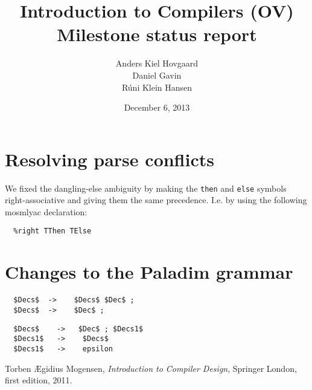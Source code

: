 \documentclass[12pt,a4paper]{article}
\begin{document}
\title{Introduction to Compilers (OV)\\
       Milestone status report}
\author{Anders Kiel Hovgaard\\
        Daniel Gavin\\
        Rúni Klein Hansen}
\date{December 6, 2013}
\maketitle

\section{Resolving parse conflicts}
We fixed the dangling-else ambiguity by making the \texttt{then} and
\texttt{else} symbols right-associative and giving them the same precedence.
I.e. by using the following mosmlyac declaration:
\begin{verbatim}
  %right TThen TElse 
\end{verbatim}

\section{Changes to the Paladim grammar}
\begin{lstlisting}
  $Decs$  ->    $Decs$ $Dec$ ;
  $Decs$  ->    $Dec$ ;
\end{lstlisting}
\begin{lstlisting}
  $Decs$    ->   $Dec$ ; $Decs1$
  $Decs1$   ->    $Decs$
  $Decs1$   ->    epsilon
\end{lstlisting}


\begin{thebibliography}{9}
    Torben Ægidius Mogensen,
    \emph{Introduction to Compiler Design},
    Springer London, first edition, 2011.
\end{thebibliography}
\end{document}
